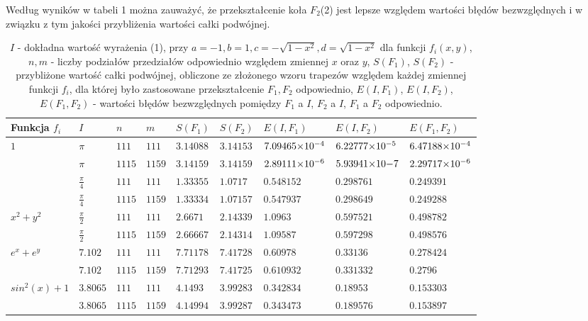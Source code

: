 \documentclass[a4paper,12pt]{article}
\newcommand{\razy}{\hspace{-0.5ex}\times\hspace{-0.5ex}} %
\begin{document}
Według wyników w tabeli 1 można zauważyć, że przekształcenie koła $F_2$(2) jest lepsze względem wartości błędów bezwzględnych i w związku z tym jakości przybliżenia wartości całki podwójnej.
\begin{table}[!h]\vspace*{-2ex}
\caption{\footnotesize $I$ - dokładna wartość wyrażenia (1), przy $a = -1, b = 1, c = -\sqrt{1 - x^2}, d  = \sqrt{1 - x^2} $ dla funkcji $f_i(x,y)$, $n,m$ - liczby podziałów przedziałów odpowiednio względem zmiennej $x$ oraz $y$, $S(F_1)$, $S(F_2)$ - przybliżone wartość całki podwójnej, obliczone ze złożonego wzoru trapezów względem każdej zmiennej funkcji $f_i$, dla której było zastosowane przekształcenie $F_1, F_2$ odpowiednio, $E(I,F_1)$, $E(I, F_2)$, $E(F_1,F_2)$ - wartości błędów bezwzględnych pomiędzy $F_1$ a $I$, $F_2$ a $I$, $F_1$ a $F_2$ odpowiednio.}\vspace{-1.5ex}
\label{T1} %
\begin{center}
\begin{small}
\begin{tabular}{|C{11ex}|C{6ex}|C{5ex}|C{5ex}|C{7ex}|C{10ex}|C{10ex}|C{10ex}|C{14ex}|}\hline
Funkcja $f_i$ & $I$ & $n$ & $m$ & $S(F_1)$ & $S(F_2)$ & $E(I,F_1)$ & $E(I,F_2)$ & $E(F_1, F_2)$\\\hline
{}
& $\pi$ & $111$ & $111$ & $3.14088$ & $3.14153$ & $7.09465\razy10^{-4}$ & $6.22777\razy10^{-5}$& $6.47188\razy10^{-4}$  \\
& $\pi$ & $1115$ & $1159$ & $3.14159$ & $3.14159$ &$2.89111\razy10^{-6}$ &$5.93941\razy10{-7}$ & $2.29717\razy10^{-6} $\\\hline

& $\frac{\pi}{4}$ & $111$ & $111$ & $1.33355$ & $1.0717$ & $0.548152$ & $0.298761$& $0.249391$  \\
& $\frac{\pi}{4}$ & $1115$ & $1159$ & $1.33334$ & $1.07157$ & $0.547937$ &$0.298649$ & $0.249288$\\\hline

& $\frac{\pi}{2}$ & $111$ & $111$ & $2.6671$ & $2.14339$ & $1.0963$ & $0.597521$& $0.498782$  \\
& $\frac{\pi}{2}$ & $1115$ & $1159$ & $2.66667$ & $2.14314$ &$1.09587$ &$0.597298$ & $0.498576$\\\hline
{}
& $7.102$ & $111$ & $111$ & $7.71178$ & $7.41728$ & $0.60978$ & $0.33136$& $0.278424$  \\
& $7.102$ & $1115$ & $1159$ & $7.71293$ & $7.41725$ &$0.610932$ &$0.331332$ & $0.2796$\\\hline
{}
& $3.8065$ & $111$ & $111$ & $4.1493$ & $3.99283$ & $0.342834$ & $0.18953$& $0.153303$  \\
& $3.8065$ & $1115$ & $1159$ & $4.14994$ & $3.99287$ &$0.343473$ &$0.189576$ & $0.153897 $\\\hline
\end{tabular}
\end{small}
\end{center}
\end{table}\vspace{-3ex}

\end{document}
